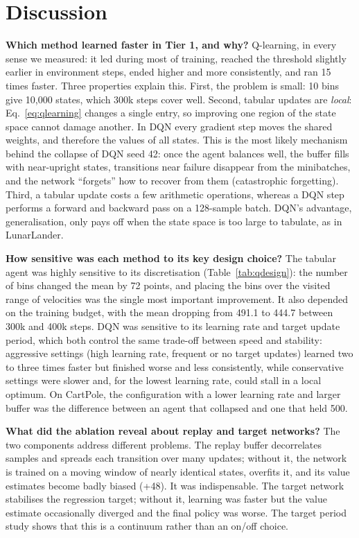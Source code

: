 \documentclass[10pt,twocolumn,letterpaper]{article}
\begin{document}
\section{Discussion}

\textbf{Which method learned faster in Tier 1, and why?} Q-learning, in every sense we measured: it led during most of training, reached the threshold slightly earlier in environment steps, ended higher and more consistently, and ran 15 times faster. Three properties explain this. First, the problem is small: 10 bins give 10{,}000 states, which 300k steps cover well. Second, tabular updates are \emph{local}: Eq.~\eqref{eq:qlearning} changes a single entry, so improving one region of the state space cannot damage another. In DQN every gradient step moves the shared weights, and therefore the values of all states. This is the most likely mechanism behind the collapse of DQN seed 42: once the agent balances well, the buffer fills with near-upright states, transitions near failure disappear from the minibatches, and the network ``forgets'' how to recover from them (catastrophic forgetting). Third, a tabular update costs a few arithmetic operations, whereas a DQN step performs a forward and backward pass on a 128-sample batch. DQN's advantage, generalisation, only pays off when the state space is too large to tabulate, as in LunarLander.

\textbf{How sensitive was each method to its key design choice?} The tabular agent was highly sensitive to its discretisation (Table~\ref{tab:qdesign}): the number of bins changed the mean by 72 points, and placing the bins over the visited range of velocities was the single most important improvement. It also depended on the training budget, with the mean dropping from 491.1 to 444.7 between 300k and 400k steps. DQN was sensitive to its learning rate and target update period, which both control the same trade-off between speed and stability: aggressive settings (high learning rate, frequent or no target updates) learned two to three times faster but finished worse and less consistently, while conservative settings were slower and, for the lowest learning rate, could stall in a local optimum. On CartPole, the configuration with a lower learning rate and larger buffer was the difference between an agent that collapsed and one that held 500.

\textbf{What did the ablation reveal about replay and target networks?} The two components address different problems. The replay buffer decorrelates samples and spreads each transition over many updates; without it, the network is trained on a moving window of nearly identical states, overfits it, and its value estimates become badly biased (+48). It was indispensable. The target network stabilises the regression target; without it, learning was faster but the value estimate occasionally diverged and the final policy was worse. The target period study shows that this is a continuum rather than an on/off choice.
\end{document}
